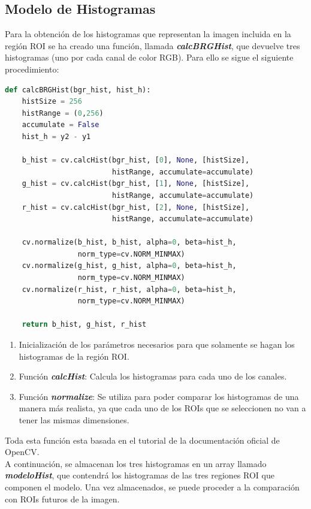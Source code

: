\documentclass[a4paper]{article} %
\renewcommand{\baselinestretch}{1.5}
\begin{document}
\subsection{Modelo de Histogramas}

Para la obtención de los histogramas que representan la imagen incluida en la región ROI se ha creado una función, llamada \textbf{\textit{calcBRGHist}}, que devuelve tres histogramas (uno por cada canal de color RGB). Para ello se sigue el siguiente procedimiento: 

\renewcommand{\baselinestretch}{1}
\begin{tcolorbox}[]
\begin{lstlisting}[language=Python]
def calcBRGHist(bgr_hist, hist_h):
    histSize = 256
    histRange = (0,256)
    accumulate = False
    hist_h = y2 - y1

    b_hist = cv.calcHist(bgr_hist, [0], None, [histSize], 
                         histRange, accumulate=accumulate)
    g_hist = cv.calcHist(bgr_hist, [1], None, [histSize], 
                         histRange, accumulate=accumulate)
    r_hist = cv.calcHist(bgr_hist, [2], None, [histSize], 
                         histRange, accumulate=accumulate)

    cv.normalize(b_hist, b_hist, alpha=0, beta=hist_h, 
                 norm_type=cv.NORM_MINMAX)
    cv.normalize(g_hist, g_hist, alpha=0, beta=hist_h, 
                 norm_type=cv.NORM_MINMAX)
    cv.normalize(r_hist, r_hist, alpha=0, beta=hist_h, 
                 norm_type=cv.NORM_MINMAX)

    return b_hist, g_hist, r_hist
\end{lstlisting}
\end{tcolorbox}
\renewcommand{\baselinestretch}{1.5}

\begin{enumerate}
    \item Inicialización de los parámetros necesarios para que solamente se hagan los histogramas de la región ROI.
    \item Función \textbf{\textit{calcHist}}: Calcula los histogramas para cada uno de los canales.
    \item Función \textbf{\textit{normalize}}: Se utiliza para poder comparar los histogramas de una manera más realista, ya que cada uno de los ROIs que se seleccionen no van a tener las mismas dimensiones.
\end{enumerate}

Toda esta función esta basada en el tutorial de la documentación oficial de OpenCV. \cite{histCalc}\\
A continuación, se almacenan los tres histogramas en un array llamado \textbf{\textit{modeloHist}}, que contendrá los histogramas de las tres regiones ROI que componen el modelo. Una vez almacenados, se puede proceder a la comparación con ROIs futuros de la imagen.
\end{document}
